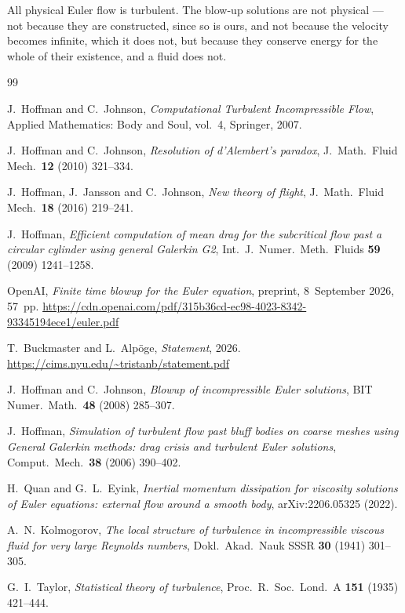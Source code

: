 \documentclass[11pt]{article}
\begin{document}
All physical Euler flow is turbulent. The blow-up solutions are not physical --- not because they
are constructed, since so is ours, and not because the velocity becomes infinite, which it does not,
but because they conserve energy for the whole of their existence, and a fluid does not.

\begin{thebibliography}{99}

 J.~Hoffman and C.~Johnson, \emph{Computational Turbulent Incompressible Flow},
Applied Mathematics: Body and Soul, vol.~4, Springer, 2007.

 J.~Hoffman and C.~Johnson, \emph{Resolution of d'Alembert's paradox},
J.\ Math.\ Fluid Mech.\ \textbf{12} (2010) 321--334.

 J.~Hoffman, J.~Jansson and C.~Johnson, \emph{New theory of flight},
J.\ Math.\ Fluid Mech.\ \textbf{18} (2016) 219--241.

 J.~Hoffman, \emph{Efficient computation of mean drag for the subcritical flow past a
circular cylinder using general Galerkin G2}, Int.\ J.\ Numer.\ Meth.\ Fluids \textbf{59} (2009)
1241--1258.

 OpenAI, \emph{Finite time blowup for the Euler equation}, preprint,
8~September 2026,
57~pp.
\newblock \url{https://cdn.openai.com/pdf/315b36cd-ec98-4023-8342-93345194ece1/euler.pdf}

 T.~Buckmaster and L.~Alp\"oge, \emph{Statement}, 2026.
\newblock \url{https://cims.nyu.edu/~tristanb/statement.pdf}

 J.~Hoffman and C.~Johnson, \emph{Blowup of incompressible Euler solutions},
BIT Numer.\ Math.\ \textbf{48} (2008) 285--307.

 J.~Hoffman, \emph{Simulation of turbulent flow past bluff bodies on coarse
meshes using General Galerkin methods: drag crisis and turbulent Euler solutions}, Comput.\ Mech.\
\textbf{38} (2006) 390--402.

 H.~Quan and G.~L.~Eyink, \emph{Inertial momentum dissipation for viscosity
solutions of Euler equations: external flow around a smooth body}, arXiv:2206.05325 (2022).

 A.~N.~Kolmogorov, \emph{The local structure of turbulence in incompressible
viscous fluid for very large Reynolds numbers}, Dokl.\ Akad.\ Nauk SSSR \textbf{30} (1941) 301--305.

 G.~I.~Taylor, \emph{Statistical theory of turbulence}, Proc.\ R.\ Soc.\ Lond.\ A
\textbf{151} (1935) 421--444.


\end{thebibliography}
\end{document}
